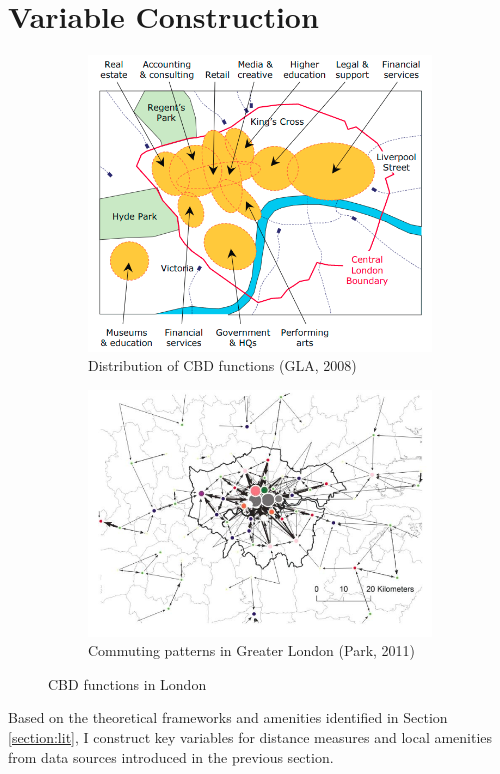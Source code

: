 \documentclass{article}
\begin{document}
\section{Variable Construction} \label{section:variables}
\begin{figure}[t]
\begin{subfigure}{.5\textwidth}
  \centering
  \includegraphics[width=.9\linewidth]{images/cbd.png}
\caption{Distribution of CBD functions (GLA, 2008)}
  \label{fig:cbd}
\end{subfigure}%
\begin{subfigure}{.5\textwidth}
  \centering
  \includegraphics[width=.9\linewidth]{images/park2011.png}
  \caption{Commuting patterns in Greater London (Park, 2011)}
  \label{fig:park2011}
\end{subfigure}
\caption{CBD functions in London}
\label{fig:2}
\end{figure}
Based on the theoretical frameworks and amenities identified in Section \ref{section:lit}, I construct key variables for distance measures and local amenities from data sources introduced in the previous section.
\end{document}
